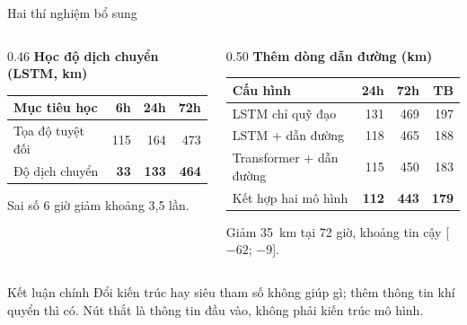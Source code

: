 \documentclass[aspectratio=169, 11pt]{beamer}
\begin{document}
\begin{frame}{Hai thí nghiệm bổ sung}
  \begin{columns}[T]
    \begin{column}{0.46\textwidth}
      \textbf{Học độ dịch chuyển (LSTM, km)}\\[2pt]
      \small
      \begin{tabular}{lrrr}
        \toprule
        \textbf{Mục tiêu học} & \textbf{6h} & \textbf{24h} & \textbf{72h} \\
        \midrule
        Tọa độ tuyệt đối & 115 & 164 & 473 \\
        Độ dịch chuyển   & \textbf{33} & \textbf{133} & \textbf{464} \\
        \bottomrule
      \end{tabular}

      \vspace{0.4em}
      \normalsize
      Sai số 6 giờ giảm khoảng 3,5 lần.
    \end{column}
    \begin{column}{0.50\textwidth}
      \textbf{Thêm dòng dẫn đường (km)}\\[2pt]
      \small
      \begin{tabular}{lrrr}
        \toprule
        \textbf{Cấu hình} & \textbf{24h} & \textbf{72h} & \textbf{TB} \\
        \midrule
        LSTM chỉ quỹ đạo        & 131 & 469 & 197 \\
        LSTM + dẫn đường        & 118 & 465 & 188 \\
        Transformer + dẫn đường & 115 & 450 & 183 \\
        Kết hợp hai mô hình     & \textbf{112} & \textbf{443} & \textbf{179} \\
        \bottomrule
      \end{tabular}

      \vspace{0.4em}
      \normalsize
      Giảm 35~km tại 72 giờ, khoảng tin cậy [$-62$; $-9$].
    \end{column}
  \end{columns}
  \vspace{0.6em}
  \begin{block}{Kết luận chính}
    Đổi kiến trúc hay siêu tham số không giúp gì; thêm thông tin khí quyển thì
    có. \alert{Nút thắt là thông tin đầu vào, không phải kiến trúc mô hình.}
  \end{block}
\end{frame}
\end{document}

